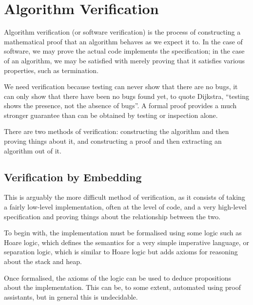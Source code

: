 \section{Algorithm Verification}
\label{sec:lit-verification}

Algorithm verification (or software verification) is the process of
constructing a mathematical proof that an algorithm behaves as we
expect it to\cite{Floyd67}. In the case of software, we may prove the
actual code implements the specification; in the case of an algorithm,
we may be satisfied with merely proving that it satisfies various
properties, such as termination.

We need verification because testing can never show that there are no
bugs, it can only show that there have been no bugs found yet, to
quote Dijkstra, ``testing shows the presence, not the absence of
bugs''\cite{Buxton70}. A formal proof provides a much stronger
guarantee than can be obtained by testing or inspection alone.

There are two methods of verification: constructing the algorithm and
then proving things about it, and constructing a proof and then
extracting an algorithm out of it.

\subsection{Verification by Embedding}
\label{sec:lit-verification-embedding}

This is arguably the more difficult method of verification, as it
consists of taking a fairly low-level implementation, often at the
level of code, and a very high-level specification and proving things
about the relationship between the two.

To begin with, the implementation must be formalised using some logic
such as Hoare logic\cite{Hoare69}, which defines the semantics for a
very simple imperative language, or separation logic\cite{Reynolds02},
which is similar to Hoare logic but adds axioms for reasoning about
the stack and heap.

Once formalised, the axioms of the logic can be used to deduce
propositions about the implementation. This can be, to some extent,
automated using proof assistants, but in general this is undecidable.

